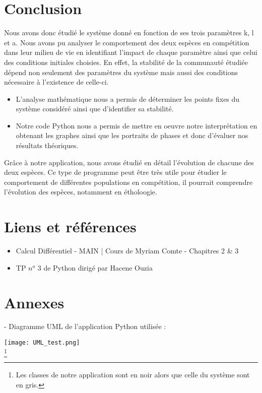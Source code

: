 \documentclass{article}
\begin{document}
\section{Conclusion}
Nous avons donc étudié le système donné en fonction de ses trois paramètres k, l et a. Nous avons pu analyser le comportement des deux espèces en compétition dans leur milieu de vie en identifiant l'impact de chaque paramètre ainsi que celui des conditions initiales choisies. En effet, la stabilité de la communauté étudiée dépend non seulement des paramètres du système mais aussi des conditions nécessaire à l'existence de celle-ci.
\begin{itemize}
    \item L'analyse mathématique nous a permis de déterminer les points fixes du système considéré ainsi que d'identifier sa stabilité.
    \item Notre code Python nous a permis de mettre en oeuvre notre interprétation en obtenant les graphes ainsi que les portraits de phases et donc d'évaluer nos résultats théoriques.
\end{itemize}
Grâce à notre application, nous avons étudié en détail l'évolution de chacune des deux espèces. Ce type de programme peut être très utile pour étudier le comportement de différentes populations en compétition, il pourrait comprendre l'évolution des espèces, notamment en étholoogie.

\vfill
\section{Liens et références}
\begin{itemize}[label=\textbullet]
    \vspace{0.3cm}
    \item Calcul Différentiel - MAIN | Cours de Myriam Comte - Chapitres 2 \& 3\\
    \item TP $n^o$ 3 de Python dirigé par Hacene Ouzia
\end{itemize}
\vfill \vfill

\newpage
\section{Annexes}
 - Diagramme UML de l'application Python utilisée :\\
\begin{center}
    \texttt{[image: UML\_test.png]}\\
    \footnote{Les classes de notre application sont en noir alors que celle du système sont en gris.} 
\end{center}
\end{document}
